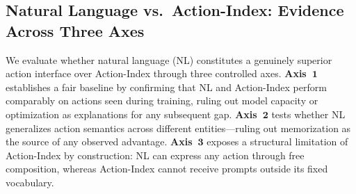 
\subsection{Natural Language vs.\ Action-Index: Evidence Across Three Axes}
\label{sec:language_vs_id}

We evaluate whether natural language (NL) constitutes a genuinely superior
action interface over Action-Index through three controlled axes.
\textbf{Axis~$\mathbf{1}$} establishes a fair baseline by
confirming that NL and Action-Index perform comparably on actions seen during training,
ruling out model capacity or optimization as explanations for any subsequent gap.
\textbf{Axis~$\mathbf{2}$} tests whether NL generalizes
action semantics across different entities---ruling out memorization as the
source of any observed advantage.
\textbf{Axis~$\mathbf{3}$} exposes a structural limitation
of Action-Index by construction: NL can express any action through free composition,
whereas Action-Index cannot receive prompts outside its fixed vocabulary.

